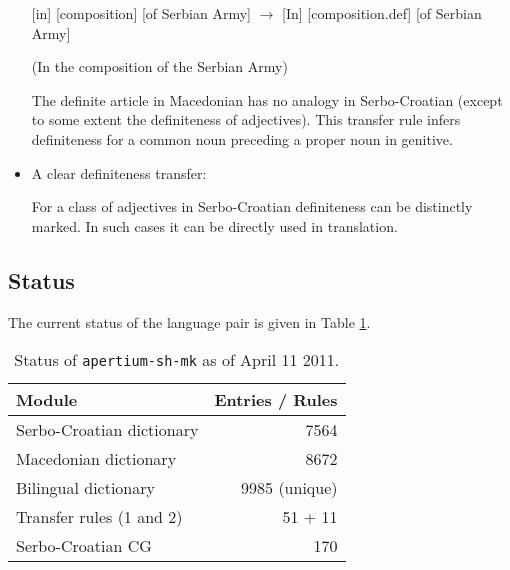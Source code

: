 \documentclass{book}
\begin{document}
\begin{itemize}
{[in] [composition] [of Serbian Army] $\rightarrow$ [In] [composition{\sc.def}] [of Serbian Army]

(In the composition of the Serbian Army)

}

The definite article in Macedonian has no analogy in Serbo-Croatian (except to some extent the definiteness of adjectives). This transfer rule infers definiteness for a common noun preceding
a proper noun in genitive.

\item A clear definiteness transfer:


For a class of adjectives in Serbo-Croatian definiteness can be
distinctly marked. In such cases it can be directly used in translation.
\end{itemize}

\subsection*{Status}
The current status of the language pair is given in Table \ref{tab:status}.

\begin{table}
\begin{center}
\caption{Status of \texttt{apertium-sh-mk} as of April 11 2011.}
\label{tab:status}
\begin{tabular}{l|r}
Module & Entries / Rules \\
\hline
Serbo-Croatian dictionary & 7564 \\
Macedonian dictionary & 8672 \\
Bilingual dictionary & 9985 (unique) \\
Transfer rules (1 and 2) & 51 + 11 \\
Serbo-Croatian CG & 170 \\
\hline
\end{tabular}
\end{center}
\end{table}
\end{document}
